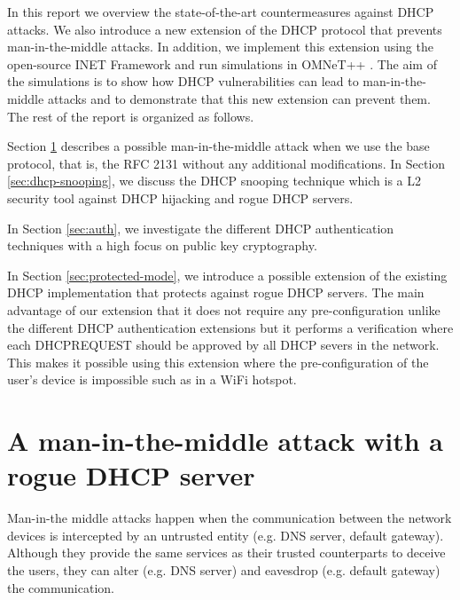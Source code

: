 \documentclass[letterpaper, 10 pt, conference]{ieeeconf}  %
\begin{document}
In this report we overview the state-of-the-art countermeasures against DHCP attacks. We also introduce a new extension of the DHCP protocol that prevents man-in-the-middle attacks. In addition, we implement this extension using the open-source INET Framework \cite{inet} and run simulations in OMNeT++ \cite{Varga:2008:OOS:1416222.1416290}. The aim of the simulations is to show how DHCP vulnerabilities can lead to man-in-the-middle attacks and to demonstrate that this new extension can prevent them. The rest of the report is organized as follows.

Section \ref{sec:man-in-the-middle} describes a possible man-in-the-middle attack when we use the base protocol, that is, the RFC 2131 without any additional modifications. In Section \ref{sec:dhcp-snooping}, we discuss the DHCP snooping technique which is a L2 security tool against DHCP hijacking and rogue DHCP servers. 

In Section \ref{sec:auth}, we investigate the different DHCP authentication techniques with a high focus on public key cryptography.

In Section \ref{sec:protected-mode}, we introduce a possible extension of the existing DHCP implementation that protects against rogue DHCP servers. The main advantage of our extension that it does not require any pre-configuration unlike the different DHCP authentication extensions but it performs a verification where each DHCPREQUEST should be approved by all DHCP severs in the network. This makes it possible using this extension where the pre-configuration of the user's device is impossible such as in a WiFi hotspot.
 
\section{A man-in-the-middle attack with a rogue DHCP server}\label{sec:man-in-the-middle}
Man-in-the middle attacks happen when the communication between the network devices is intercepted by an untrusted entity (e.g. DNS server, default gateway). Although they provide the same services as their trusted counterparts to deceive the users, they can alter (e.g. DNS server) and eavesdrop (e.g. default gateway) the communication.
\end{document}
